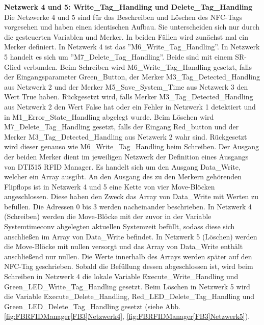 \textbf{Netzwerk 4 und 5: Write\_Tag\_Handling und Delete\_Tag\_Handling}\\Die Netzwerke 4 und 5 sind für das Beschreiben und Löschen des NFC-Tags vorgesehen und haben einen identischen Aufbau. Sie unterscheiden sich nur durch die gesteuerten Variablen und Merker. In beiden Fällen wird zunächst mal ein Merker definiert. In Netzwerk 4 ist das ''M6\_Write\_Tag\_Handling''. In Netzwerk 5 handelt es sich um ''M7\_Delete\_Tag\_Handling''. Beide sind mit einem SR-Glied verbunden. Beim Schreiben wird M6\_Write\_Tag\_Handling gesetzt, falls der Eingangsparameter Green\_Button, der Merker M3\_Tag\_Detected\_Handling aus Netzwerk 2 und der Merker M5\_Save\_System\_Time aus Netzwerk 3 den Wert True haben. Rückgesetzt wird, falls Merker M3\_Tag\_Detected\_Handling aus Netzwerk 2 den Wert False hat oder ein Fehler in Netzwerk 1 detektiert und in M1\_Error\_State\_Handling abgelegt wurde. Beim Löschen wird M7\_Delete\_Tag\_Handling gesetzt, falls der Eingang Red\_button und der Merker M3\_Tag\_Detected\_Handling aus Netzwerk 2 wahr sind. Rückgesetzt wird dieser genauso wie M6\_Write\_Tag\_Handling beim Schreiben. Der Ausgang der beiden Merker dient im jeweiligen Netzwerk der Definition eines Ausgangs von DTI515 RFID Manager. Es handelt sich um den Ausgang Data\_Write, welcher ein Array ausgibt. An den Ausgang des zu den Merkern gehörenden Flipflops ist in Netzwerk 4 und 5 eine Kette von vier Move-Blöcken angeschlossen. Diese haben den Zweck das Array von Data\_Write mit Werten zu befüllen. Die Adressen 0 bis 3 werden nacheinander beschrieben. In Netzwerk 4 (Schreiben) werden die Move-Blöcke mit der zuvor in der Variable Systemtimeconv abgelegten aktuellen Systemzeit befüllt, sodass diese sich anschließen im Array von Data\_Write befindet. In Netzwerk 5 (Löschen) werden die Move-Blöcke mit nullen versorgt und das Array von Data\_Write enthält anschließend nur nullen. Die Werte innerhalb des Arrays werden später auf den NFC-Tag geschrieben. Sobald die Befüllung dessen abgeschlossen ist, wird beim Schreiben in Netzwerk 4 die lokale Variable Execute\_Write\_Handling und Green\_LED\_Write\_Tag\_Handling gesetzt. Beim Löschen in Netzwerk 5 wird die Variable Execute\_Delete\_Handling, Red\_LED\_Delete\_Tag\_Handling und Green\_LED\_Delete\_Tag\_Handling gesetzt  (siehe Abb. \ref{fig:FBRFIDManager[FB3]Netzwerk4}, \ref{fig:FBRFIDManager[FB3]Netzwerk5}).

